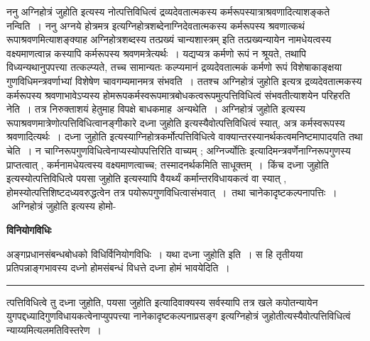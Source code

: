 \documentclass[11pt, openany]{book}
\begin{document}
{\br ननु} {\qt अग्निहोत्रं जुहोति} इत्यस्य नोत्पत्तिविधित्वं द्रव्यदेवतात्मकस्य कर्मरूपस्यात्राश्रवणादित्याशङ्कते {\br नन्विति~।} {\br ननु} {\qt अग्नये होत्रमत्र}
इत्यग्निहोत्रशब्देनाग्निदेवतात्मकस्य कर्मरूपस्य श्रवणात्कथं रूपाश्रवणमित्याशङ्क्याह अग्निहोत्रशब्दस्य {\qt तत्प्रख्यं चान्यशास्त्रम्} इति तत्प्रख्यन्यायेन नामधेयत्वस्य वक्ष्यमाणत्वान्न कस्यापि कर्मरूपस्य श्रवणमत्रेत्यर्थः~। यद्यप्यत्र कर्मणो रूपं न श्रूयते, तथापि विध्यन्यथानुपपत्त्या तत्कल्प्यते, तच्च सामान्यतः कल्प्यमानं द्रव्यदेवतात्मकं कर्मणो रूपं विशेषाकाङ्क्षया गुणविधिमन्त्रवर्णाभ्यां विशेषेण चावगम्यमानमत्र संभवति~। ततश्च {\qt अग्निहोत्रं जुहोति} इत्यत्र द्रव्यदेवतात्मकस्य कर्मरूपस्य श्रवणाभावेऽप्यस्य होमरूपकर्मस्वरूपमात्रबोधकत्वरूपमुत्पत्तिविधित्वं संभवतीत्याशयेन परिहरति {\br नेति~।} तत्र निरुक्ताशयं हेतुमाह विपक्षे बाधकमाह\textendash\ {\br अन्यथेति~।} {\qt अग्निहोत्रं जुहोति} इत्यस्य रूपाश्रवणमात्रेणोत्पत्तिविधित्वानङ्गीकारे {\qt दध्ना जुहोति} इत्यस्यैवोत्पत्तिविधित्वं स्यात्, अत्र कर्मस्वरूपस्य श्रवणादित्यर्थः~। {\qt दध्ना जुहोति} इत्यस्याग्निहोत्रकर्मोत्पत्तिविधित्वे वाक्यान्तरस्यानर्थकत्वमनिष्टमापादयति {\br तथा चेति~।} न चाग्निरूपगुणविधित्वेनाप्यस्योपपत्तिरिति वाच्यम् ; {\qt अग्निर्ज्योतिः}
इत्यादिमन्त्रवर्णेनाग्निरूपगुणस्य प्राप्तत्वात् , कर्मनामधेयत्वस्य वक्ष्यमाणत्वाच्च; तस्मादनर्थकमिति साधूक्तम्~।~किंच {\qt दध्ना जुहोति} इत्यस्योत्पत्तिविधित्वे {\qt पयसा जुहोति} इत्यस्यापि वैयर्थ्यं कर्मान्तरविधायकत्वं वा स्यात् , होमस्योत्पत्तिशिष्टदध्यवरुद्धत्वेन तत्र पयोरूपगुणविधित्वासंभवात्~।~तथा चानेकादृष्टकल्पनापत्तिः~।~{\qt अग्निहोत्रं
जुहोति} इत्यस्य होमो-
\newpage
\fancyhead[LO]{[ विनियोगविधिः]}
\begin{center}
  \textbf{विनियोगविधिः} 
\end{center}

{\bl अङ्गप्रधानसंबन्धबोधको विधिर्विनियोगविधिः~। यथा {\qtl दध्ना जुहोति} इति~। स हि तृतीयया प्रतिपन्नाङ्गभावस्य दध्नो होमसंबन्धं विधत्ते दध्ना होमं भावयेदिति~।}\\
\hrule
\vspace{3mm}
\noindent
त्पत्तिविधित्वे तु {\qt दध्ना जुहोति, पयसा जुहोति} इत्यादिवाक्यस्य सर्वस्यापि तत्र खले कपोतन्यायेन युगपद्दध्यादिगुणविधायकत्वेनाप्युपपत्त्या नानेकादृष्टकल्पनाप्रसङ्ग इत्यग्निहोत्रं जुहोतीत्यस्यैवोत्पत्तिविधित्वं न्याय्यमित्यलमतिविस्तरेण~।\\
\end{document}
